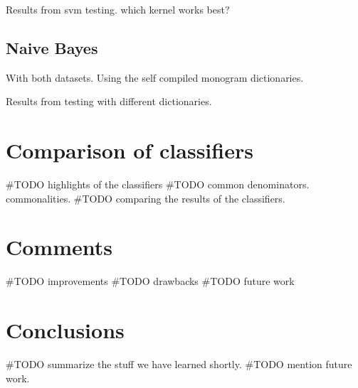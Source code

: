 Results from svm testing. which kernel works best?

\subsection{Naive Bayes}
With both datasets.
Using the self compiled monogram dictionaries. 

Results from testing with different dictionaries. 

\section{Comparison of classifiers}
#TODO highlights of the classifiers
#TODO common denominators. commonalities.   
#TODO comparing the results of the classifiers.  

\section{Comments}
#TODO improvements
#TODO drawbacks
#TODO future work

\section{Conclusions}
#TODO summarize the stuff we have learned shortly. 
#TODO mention future work. 
